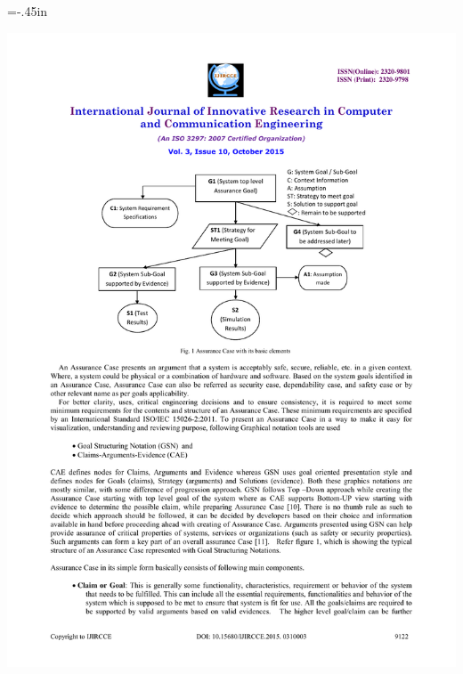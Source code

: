 \documentclass[t,12pt,numbers,fleqn]{beamer}
\begin{document}

\hoffset=-.45in
\begin{frame}[plain]

\includegraphics[width=1.19\textwidth]{../Figures/assuranceBasic.pdf}

\end{frame}
\hoffset=0in

\end{document}
